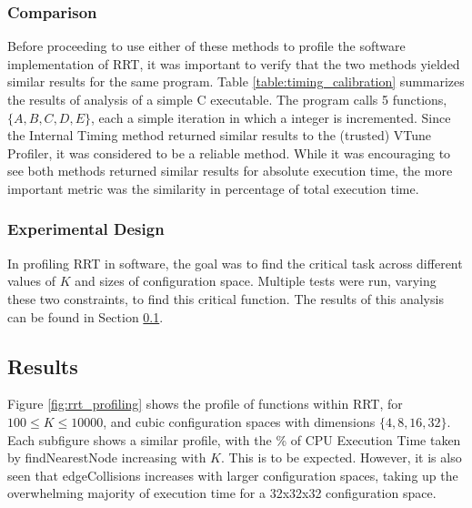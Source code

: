 
    \subsubsection*{Comparison}
        Before proceeding to use either of these methods to profile the software implementation of \ac{RRT}, it was important to verify that the two methods yielded similar results for the same program. Table \ref{table:timing_calibration} summarizes the results of analysis of a simple C executable. The program calls 5 functions, $\{A, B, C, D, E\}$, each a simple iteration in which a integer is incremented. Since the Internal Timing method returned similar results to the (trusted) VTune Profiler, it was considered to be a reliable method. While it was encouraging to see both methods returned similar results for absolute execution time, the more important metric was the similarity in percentage of total execution time.

        

    \subsubsection*{Experimental Design}
        In profiling \ac{RRT} in software, the goal was to find the critical task across different values of $K$ and sizes of configuration space. Multiple tests were run, varying these two constraints, to find this critical function. The results of this analysis can be found in Section \ref{section:rrt_analysis_results}.

\subsection{Results}
\label{section:rrt_analysis_results}
    Figure \ref{fig:rrt_profiling} shows the profile of functions within \ac{RRT}, for $100 \leq K \leq 10000$, and cubic configuration spaces with dimensions $\{4, 8, 16, 32\}$. Each subfigure shows a similar profile, with the \% of CPU Execution Time taken by findNearestNode increasing with $K$. This is to be expected. However, it is also seen that edgeCollisions increases with larger configuration spaces, taking up the overwhelming majority of execution time for a 32x32x32 configuration space.
    
    \newpage
    

